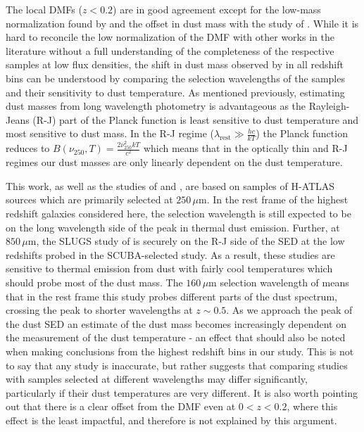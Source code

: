 The local DMFs ($z < 0.2$) are in good agreement except for the low-mass normalization found by \citealt{Dunne_2011} and the offset in dust mass with the study of \citealt{Pozzi_2020}. While it is hard to reconcile the low normalization of the \citealt{Dunne_2011} DMF with other works in the literature without a full understanding of the completeness of the respective samples at low flux densities, the shift in dust mass observed by \citealt{Pozzi_2020} in all redshift bins can be understood by comparing the selection wavelengths of the samples and their sensitivity to dust temperature. As mentioned previously, estimating dust masses from long wavelength photometry is advantageous as the Rayleigh-Jeans (R-J) part of the Planck function is least sensitive to dust temperature and most sensitive to dust mass. In the R-J regime ($\lambda_{\textrm{rest}} \gg \frac{hc}{kT}$) the Planck function reduces to $B(\nu_{250}, T) = \frac{2\nu_{250}^{2}kT}{c^2}$ which means that in the optically thin and R-J regimes our dust masses are only linearly dependent on the dust temperature.

This work, as well as the studies of \citealt{Dunne_2011} and \citealt{Beeston_2018}, are based on samples of H-ATLAS sources which are primarily selected at $250\,\mu$m. In the rest frame of the highest redshift galaxies considered here, the selection wavelength is still expected to be on the long wavelength side of the peak in thermal dust emission. Further, at $850\,\mu$m, the SLUGS study of \citealt{Vlahakis_2005} is securely on the R-J side of the SED at the low redshifts probed in the SCUBA-selected study. As a result, these studies are sensitive to thermal emission from dust with fairly cool temperatures which should probe most of the dust mass. The $160\,\mu$m selection wavelength of \citealt{Pozzi_2020} means that in the rest frame this study probes different parts of the dust spectrum, crossing the peak to shorter wavelengths at $z \sim 0.5$. As we approach the peak of the dust SED an estimate of the dust mass becomes increasingly dependent on the measurement of the dust temperature - an effect that should also be noted when making conclusions from the highest redshift bins in our study. This is not to say that any study is inaccurate, but rather suggests that comparing studies with samples selected at different wavelengths may differ significantly, particularly if their dust temperatures are very different. It is also worth pointing out that there is a clear offset from the \citealt{Pozzi_2020} DMF even at $0 < z < 0.2$, where this effect is the least impactful, and therefore is not explained by this argument.

